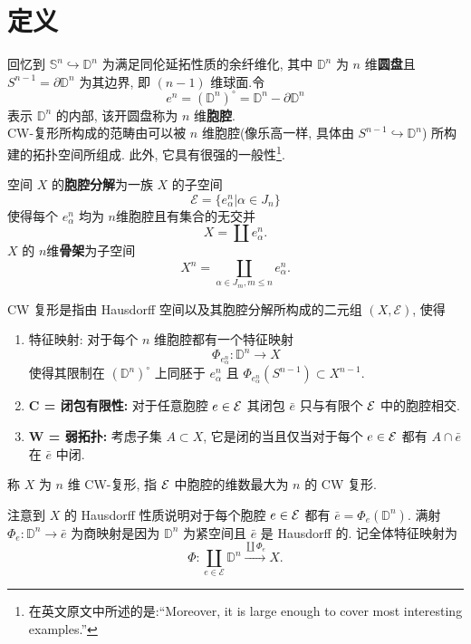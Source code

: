 \section{定义}
回忆到 $\mathbb{S}^n \hookrightarrow \mathbb{D}^n$ 为满足同伦延拓性质的余纤维化, 其中 $\mathbb{D}^n$ 为 $n$ 维\textbf{圆盘}且 
$S^{n-1} = \partial \mathbb{D}^n$ 为其边界, 即 $(n-1)$ 维球面.令
\[
    e^n = (\mathbb{D}^n)^{\circ} = \mathbb{D}^n - \partial \mathbb{D}^n
\]
表示 $\mathbb{D}^n$ 的内部, 该开圆盘称为 $n$ 维\textbf{胞腔}.\\
CW-复形所构成的范畴由可以被 $n$ 维胞腔(像乐高一样, 具体由 $S^{n-1} \hookrightarrow \mathbb{D}^n$) 所构建的拓扑空间所组成.
此外, 它具有很强的一般性\footnote{在英文原文中所述的是:``Moreover, it is large enough to cover most interesting examples.''}.
\begin{definition}
    空间 $X$ 的\textbf{胞腔分解}为一族 $X$ 的子空间
    \[
        \mathcal{E} = \{e_{\alpha}^n | \alpha \in J_n\}
    \]
    使得每个 $e_{\alpha}^n$ 均为 $n$维胞腔且有集合的无交并
    \[
        X = \coprod e_{\alpha}^n.
    \]
    $X$ 的 $n$维\textbf{骨架}为子空间
    \[
        X^n = \coprod_{\alpha \in J_m , m\leq n} e_{\alpha}^n.
    \]
\end{definition}
\begin{definition}
    CW 复形是指由 Hausdorff 空间以及其胞腔分解所构成的二元组 $(X,\mathcal{E})$, 使得
    \begin{enumerate}
        \item 特征映射: 对于每个 $n$ 维胞腔都有一个特征映射
        \[
            \Phi_{e_{\alpha}^n} \colon \mathbb{D}^n \to X
        \]
        使得其限制在 $(\mathbb{D}^n)^{\circ}$ 上同胚于 $e_{\alpha}^n$ 且 $\Phi_{e_{\alpha}^n}(S^{n-1}) \subset X^{n-1}$.
        \item \textbf{C = 闭包有限性:} 对于任意胞腔 $e\in \cal{E}$ 其闭包 $\bar{e}$ 只与有限个 $\cal{E}$ 中的胞腔相交.
        \item \textbf{W = 弱拓扑:} 考虑子集 $A \subset X$, 它是闭的当且仅当对于每个 $e\in \cal{E}$ 都有 $A\cap \bar{e}$ 在 $\bar{e}$ 中闭.
    \end{enumerate} 
    称 $X$ 为 $n$ 维 CW-复形, 指 $\cal{E}$ 中胞腔的维数最大为 $n$ 的 CW 复形.
\end{definition}
注意到 $X$ 的 Hausdorff 性质说明对于每个胞腔 $e\in \cal{E}$ 都有 $\bar{e} = \Phi_e(\mathbb{D}^n)$. 
满射 $\Phi_e \colon \mathbb{D}^n \to \bar{e}$ 为商映射是因为 $\mathbb{D}^n$ 为紧空间且 $\bar{e}$ 是 Hausdorff 的.
记全体特征映射为
\[
    \Phi : \coprod_{e\in \mathcal{E}}\mathbb{D}^n \xrightarrow{\coprod \Phi_e} X.
\]    
